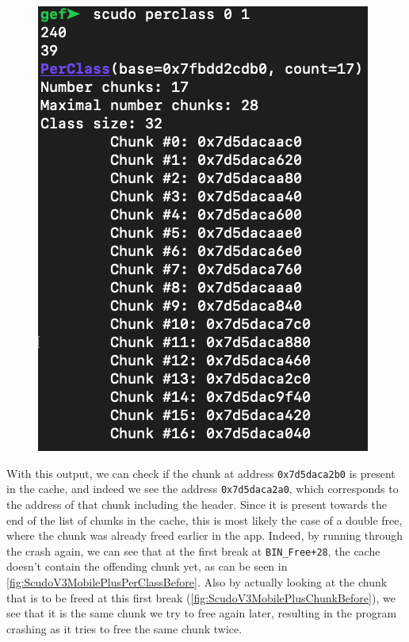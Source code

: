 \documentclass[a4paper,11pt,oneside]{report}
\begin{document}
\begin{figure}[h!]
\begin{minipage}{.5\textwidth}
  \includegraphics[width=.95\linewidth]{figures/ScudoV3MobilePlusPerClassBefore.png}
  \label{fig:ScudoV3MobilePlusPerClassBefore}
\end{minipage}
\end{figure}

With this output, we can check if the chunk at address \verb|0x7d5daca2b0| is
present in the cache, and indeed we see the address \verb|0x7d5daca2a0|, which
corresponds to the address of that chunk including the header. Since it is
present towards the end of the list of chunks in the cache, this is most likely
the case of a double free, where the chunk was already freed earlier in the app.
Indeed, by running through the crash again, we can see that at the first break at
\verb|BIN_Free+28|, the cache doesn't contain the offending chunk yet, as can be
seen in \autoref{fig:ScudoV3MobilePlusPerClassBefore}. Also by actually looking
at the chunk that is to be freed at this first break (\autoref{fig:ScudoV3MobilePlusChunkBefore}),
we see that it is the same chunk we try to free again later, resulting in the
program crashing as it tries to free the same chunk twice.
\end{document}
